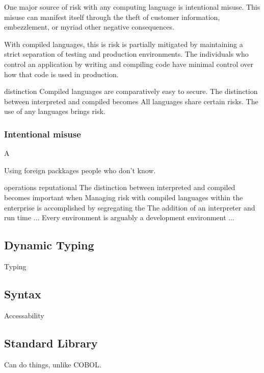 		One major source of risk with any computing language is intentional misuse. This misuse can manifest itself through the theft of customer information, embezzlement, or myriad other negative consequences.

		With compiled languages, this is risk is partially mitigated by maintaining a strict separation of testing and production environments. The individuals who control an application by writing and compiling code have minimal control over how that code is used in production.

		distinction
		Compiled languages are comparatively easy to secure.
		The distinction between interpreted and compiled becomes 
		All languages share certain risks.
		The use of any languages brings risk. 

		\subsubsection{Intentional misuse}
			A

		Using foreign packkages people who don't know.

		operations reputational
		The distinction between interpreted and compiled becomes important when 
		Managing risk with compiled languages within the enterprise is accomplished by segregating the 
		The addition of an interpreter and run time ...
		Every environment is arguably a development environment ...

			
	\subsection{Dynamic Typing}

		Typing

	\subsection{Syntax}

		Accessability

	\subsection{Standard Library}

		Can do things, unlike COBOL.